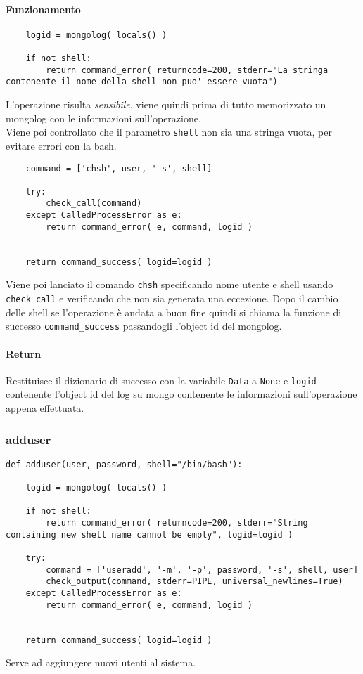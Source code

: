 \documentclass[11pt]{article}
\begin{document}
\paragraph{Funzionamento}
\begin{lstlisting}
    logid = mongolog( locals() )
    
    if not shell:
        return command_error( returncode=200, stderr="La stringa contenente il nome della shell non puo' essere vuota")
\end{lstlisting}
L'operazione risulta \textit{sensibile}, viene quindi prima di tutto memorizzato un mongolog con le informazioni
sull'operazione.\\
Viene poi controllato che il parametro \texttt{shell} non sia una stringa vuota, per evitare errori con la bash.
\begin{lstlisting}
    command = ['chsh', user, '-s', shell]
    
    try:
        check_call(command)
    except CalledProcessError as e:
        return command_error( e, command, logid )

    
    return command_success( logid=logid )
\end{lstlisting}
Viene poi lanciato il comando \texttt{chsh} specificando nome utente e shell usando \texttt{check\_call} e verificando
che non sia generata una eccezione. Dopo il cambio delle shell se l'operazione è andata a buon fine quindi si chiama
la funzione di successo \texttt{command\_success} passandogli l'object id del mongolog.
\paragraph{Return}
Restituisce il dizionario di successo con la variabile \texttt{Data} a \texttt{None} e \texttt{logid} contenente
l'object id del log su mongo contenente le informazioni sull'operazione appena effettuata.

\subsubsection{adduser}\label{adduser}
\begin{lstlisting}
def adduser(user, password, shell="/bin/bash"):
	
    logid = mongolog( locals() )
    
    if not shell:
        return command_error( returncode=200, stderr="String containing new shell name cannot be empty", logid=logid )
    
    try:
        command = ['useradd', '-m', '-p', password, '-s', shell, user]
        check_output(command, stderr=PIPE, universal_newlines=True)
    except CalledProcessError as e:
        return command_error( e, command, logid )
    

    return command_success( logid=logid )
\end{lstlisting}
Serve ad aggiungere nuovi utenti al sistema.
\end{document}
